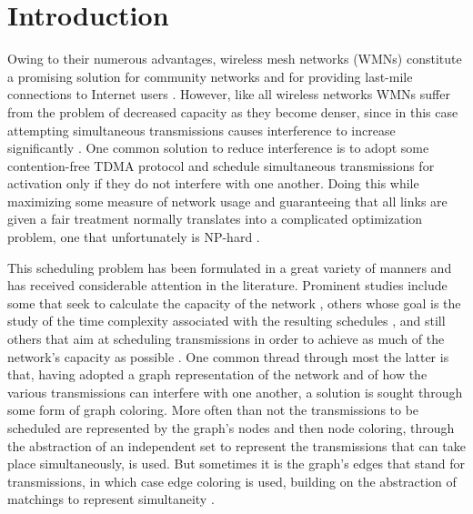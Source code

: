 \documentclass{article}
\begin{document}
\newpage
\section{Introduction}\label{sec:intro}

Owing to their numerous advantages, wireless mesh networks (WMNs) constitute a
promising solution for community networks and for providing last-mile
connections to Internet users \cite{aww05,bvb05,nnshwa07}. However, like all
wireless networks WMNs suffer from the problem of decreased capacity as they
become denser, since in this case attempting simultaneous transmissions causes
interference to increase significantly \cite{gk00,sgpsbb07}. One common solution
to reduce interference is to adopt some contention-free TDMA protocol
\cite{dea06} and schedule simultaneous transmissions for activation only if they
do not interfere with one another. Doing this while maximizing some measure of
network usage and guaranteeing that all links are given a fair treatment
normally translates into a complicated optimization problem, one that
unfortunately is NP-hard \cite{bbkmt04}.

This scheduling problem has been formulated in a great variety of manners and
has received considerable attention in the literature. Prominent studies include
some that seek to calculate the capacity of the network \cite{gk00,gwhw09},
others whose goal is the study of the time complexity associated with the
resulting schedules \cite{mwz06}, and still others that aim at scheduling
transmissions in order to achieve as much of the network's capacity as possible
\cite{cs03,abl05,wwlsf06,gdp08,hl08,wdjhl08,smrdb09,xt09,wg09}. One common
thread through most the latter is that, having adopted a graph representation of
the network and of how the various transmissions can interfere with one another,
a solution is sought through some form of graph coloring. More often than not
the transmissions to be scheduled are represented by the graph's nodes and then
node coloring, through the abstraction of an independent set to represent the
transmissions that can take place simultaneously, is used. But sometimes it is
the graph's edges that stand for transmissions, in which case edge coloring is
used, building on the abstraction of matchings to represent simultaneity
\cite{bm08}.
\end{document}
